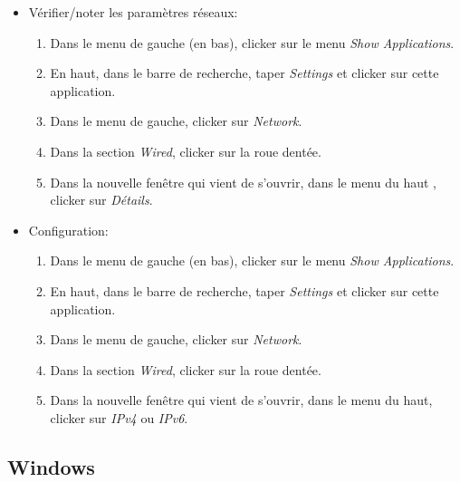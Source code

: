 \documentclass[a4paper]{article}
\begin{document}
\begin{itemize}





\item Vérifier/noter les paramètres réseaux:
\begin{enumerate}
    \item Dans le menu de gauche (en bas), clicker sur le menu \textit{Show Applications}.
    \item En haut, dans le barre de recherche, taper \textit{Settings} et clicker sur cette application.
    \item Dans le menu de gauche, clicker sur \textit{Network}.
    \item Dans la section \textit{Wired}, clicker sur la roue dentée.
    \item Dans la nouvelle fenêtre qui vient de s'ouvrir, dans le menu du haut , clicker sur \textit{Détails}.
\end{enumerate}





\item Configuration:
\begin{enumerate}
    \item Dans le menu de gauche (en bas), clicker sur le menu \textit{Show Applications}.
    \item En haut, dans le barre de recherche, taper \textit{Settings} et clicker sur cette application.
    \item Dans le menu de gauche, clicker sur \textit{Network}.
    \item Dans la section \textit{Wired}, clicker sur la roue dentée.
    \item Dans la nouvelle fenêtre qui vient de s'ouvrir, dans le menu du haut, clicker sur \textit{IPv4} ou \textit{IPv6}.
\end{enumerate}





\end{itemize}










\subsection{Windows} \label{subsec:WindowsGUI}
\end{document}
